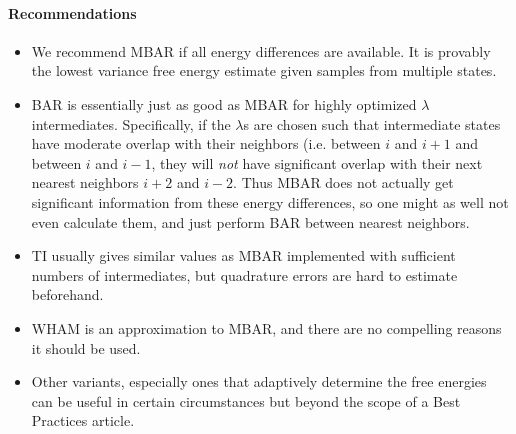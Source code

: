 \documentclass[9pt,bestpractices]{livecoms}
\begin{document}
\paragraph{Recommendations}
\begin{itemize}
\item We recommend MBAR if all energy differences are available. It is provably the lowest variance free energy estimate given samples from multiple states.
\item BAR is essentially just as good as MBAR for highly optimized $\lambda$ intermediates. Specifically, if the $\lambda$s are chosen such that intermediate states have moderate overlap with their neighbors (i.e. between $i$ and $i+1$ and between $i$ and $i-1$, they will \textit{not} have significant overlap with their next nearest neighbors $i+2$ and $i-2$. Thus MBAR does not actually get significant information from these energy differences, so one might as well not even calculate them, and just perform BAR between nearest neighbors.~\cite{paliwal2011benchmark} 
\item TI usually gives similar values as MBAR implemented with sufficient numbers of intermediates, but quadrature errors are hard to estimate beforehand.~\cite{paliwal2011benchmark}
\item WHAM is an approximation to MBAR, and there are no compelling reasons it should be used. 
\item Other variants, especially ones that adaptively determine the free energies can be  useful in certain circumstances but beyond the scope of a Best Practices article.
\end{itemize}
%
\end{document}
